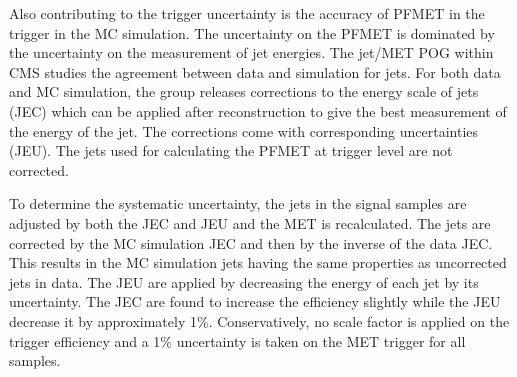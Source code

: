 

Also contributing to the trigger uncertainty is the accuracy of PFMET in the trigger in the MC simulation. The uncertainty on the PFMET is dominated by the uncertainty on
the measurement of jet energies. The jet/MET POG within CMS studies the agreement between data and simulation for jets. For both data and MC simulation,
the group releases corrections to the energy scale of jets (JEC) which can be applied after reconstruction to give the best measurement of the energy of the jet. The corrections
come with corresponding uncertainties (JEU). The jets used for calculating the PFMET at trigger level are not corrected.

To determine the systematic uncertainty, the jets in the signal samples are adjusted by both the JEC and JEU and the MET is recalculated.
The jets are corrected by the MC simulation JEC and then by the inverse of the data JEC.
This results in the MC simulation jets having the same properties as uncorrected jets in data.
The JEU are applied by decreasing the energy of each jet by its uncertainty.
The JEC are found to increase the efficiency slightly while the JEU decrease it by approximately 1\%.
Conservatively, no scale factor is applied on the trigger efficiency and a 1\% uncertainty is taken on the MET trigger for all samples.

